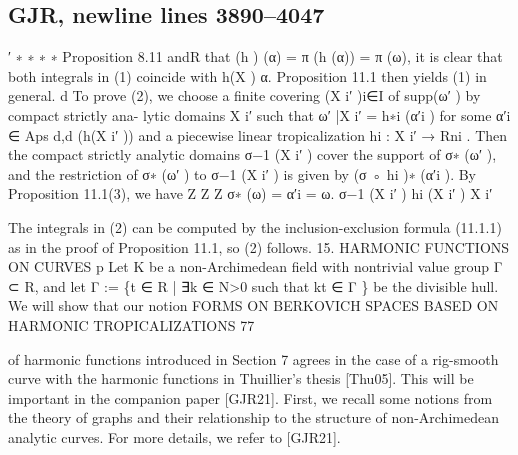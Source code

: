 \documentclass[
  10pt,
]{article}
\newenvironment{Shaded}{}{}
\newcommand{\NormalTok}[1]{#1}
\begin{document}
\subsection{GJR, newline lines
3890--4047}\label{gjr-newline-lines-38904047}

\begin{Shaded}
\begin{Highlighting}[]
\NormalTok{                                 ′ ∗           ∗ ∗             ∗}
\NormalTok{Proposition 8.11 andR that (h ) (α) = π (h (α)) = π (ω), it is clear that both integrals in}
\NormalTok{(1) coincide with h(X ) α. Proposition 11.1 then yields (1) in general.}
\NormalTok{                          d}
\NormalTok{   To prove (2), we choose a finite covering (X i′ )i∈I of supp(ω′ ) by compact strictly ana{-}}
\NormalTok{lytic domains X i′ such that ω′ |X i′ = h∗i (α′i ) for some α′i ∈ Aps}
\NormalTok{                                                                   d,d}
\NormalTok{                                                                       (h(X i′ )) and a piecewise linear}
\NormalTok{tropicalization hi : X i′ → Rni . Then the compact strictly analytic domains σ−1 (X i′ ) cover}
\NormalTok{the support of σ∗ (ω′ ), and the restriction of σ∗ (ω′ ) to σ−1 (X i′ ) is given by (σ ◦ hi )∗ (α′i ).}
\NormalTok{By Proposition 11.1(3), we have}
\NormalTok{                              Z                        Z          Z}
\NormalTok{                                               σ∗ (ω) =                α′i =          ω.}
\NormalTok{                                 σ−1 (X i′ )              hi (X i′ )           X i′}

\NormalTok{The integrals in (2) can be computed by the inclusion{-}exclusion formula (11.1.1) as in}
\NormalTok{the proof of Proposition 11.1, so (2) follows.                                      }
\NormalTok{                             15. HARMONIC FUNCTIONS ON CURVES}
\NormalTok{                                                                                  p}
\NormalTok{   Let K be a non{-}Archimedean field with nontrivial value group Γ ⊂ R, and let Γ :=}
\NormalTok{\{t ∈ R | ∃k ∈ N\textgreater{}0 such that kt ∈ Γ \} be the divisible hull. We will show that our notion}
\NormalTok{              FORMS ON BERKOVICH SPACES BASED ON HARMONIC TROPICALIZATIONS                77}

\NormalTok{of harmonic functions introduced in Section 7 agrees in the case of a rig{-}smooth curve}
\NormalTok{with the harmonic functions in Thuillier’s thesis [Thu05]. This will be important in the}
\NormalTok{companion paper [GJR21].}
\NormalTok{   First, we recall some notions from the theory of graphs and their relationship to the}
\NormalTok{structure of non{-}Archimedean analytic curves. For more details, we refer to [GJR21].}


\end{Highlighting}
\end{Shaded}
\end{document}
